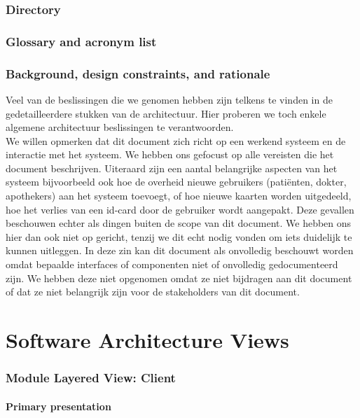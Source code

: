 \documentclass[a4paper,10pt]{article}
\begin{document}
\clearpage
\section{Directory}

\clearpage
\section{Glossary and acronym list}

\clearpage
\section{Background, design constraints, and rationale}
Veel van de beslissingen die we genomen hebben zijn telkens te vinden in de gedetailleerdere stukken van de architectuur.  Hier proberen we toch enkele algemene architectuur beslissingen te verantwoorden.\\
We willen opmerken dat dit document zich richt op een werkend systeem en de interactie met het systeem.  We hebben ons gefocust op alle vereisten die het document beschrijven.  Uiteraard zijn een aantal belangrijke aspecten van het systeem bijvoorbeeld ook hoe de overheid nieuwe gebruikers (patiënten, dokter, apothekers) aan het systeem toevoegt, of hoe nieuwe kaarten worden uitgedeeld, hoe het verlies van een id-card door de gebruiker wordt aangepakt.  Deze gevallen beschouwen echter als dingen buiten de scope van dit document.  We hebben ons hier dan ook niet op gericht, tenzij we dit echt nodig vonden om iets duidelijk te kunnen uitleggen. In deze zin kan dit document als onvolledig beschouwt worden omdat bepaalde interfaces of componenten niet of onvolledig gedocumenteerd zijn.  We hebben deze niet opgenomen omdat ze niet bijdragen aan dit document of dat ze niet belangrijk zijn voor de stakeholders van dit document.

\clearpage
\part{Software Architecture Views}
\setcounter{section}{0}

\section{Module Layered View: Client}

\subsection{Primary presentation}
\end{document}
